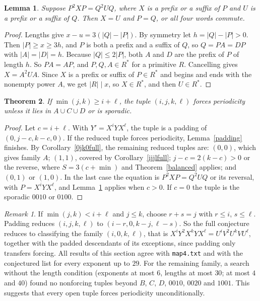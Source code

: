 \documentclass[10pt]{article}
\newtheorem{theorem}{Theorem}
\newtheorem{lemma}[theorem]{Lemma}
\theoremstyle{remark}\newtheorem*{remark}{Remark}
\begin{document}
\begin{lemma}\label{single}
Suppose \(P^2XP=Q^2UQ\), where \(X\) is a prefix or a suffix of \(P\) and \(U\) is a prefix or a suffix of \(Q\). Then \(X=U\) and \(P=Q\), or all four words commute.
\end{lemma}
\begin{proof}
Lengths give \(x-u=3(|Q|-|P|)\). By symmetry let \(h=|Q|-|P|>0\). Then \(|P|\ge x\ge3h\), and \(P\) is both a prefix and a suffix of \(Q\), so \(Q=PA=DP\) with \(|A|=|D|=h\). Because \(|Q|\le2|P|\), both \(A\) and \(D\) are the prefix of \(P\) of length \(h\). So \(PA=AP\), and \(P,Q,A\in R^*\) for a primitive \(R\). Cancelling gives \(X=A^2UA\). Since \(X\) is a prefix or suffix of \(P\in R^*\) and begins and ends with the nonempty power \(A\), we get \(|R|\mid x\), so \(X\in R^*\), and then \(U\in R^*\).
\end{proof}

\begin{theorem}\label{region}
If \(\min(j,k)\ge i+\ell\), the tuple \((i,j,k,\ell)\) forces periodicity unless it lies in \(A\cup C\cup D\) or is sporadic.
\end{theorem}
\begin{proof}
Let \(c=i+\ell\). With \(Y'=X^iYX^\ell\), the tuple is a padding of \((0,j-c,k-c,0)\). If the reduced tuple forces periodicity, Lemma~\ref{padding} finishes. By Corollary~\ref{0jk0full}, the remaining reduced tuples are: \((0,0)\), which gives family \(A\); \((1,1)\), covered by Corollary~\ref{ijjlfull}; \(j-c=2(k-c)>0\) or the reverse, where \(S=3(c+\min)\) and Theorem~\ref{balanced} applies; and \((0,1)\) or \((1,0)\). In the last case the equation is \(P^2XP=Q^2UQ\) or its reversal, with \(P=X^iYX^\ell\), and Lemma~\ref{single} applies when \(c>0\). If \(c=0\) the tuple is the sporadic \(0010\) or \(0100\).
\end{proof}

\begin{remark}
If \(\min(j,k)<i+\ell\) and \(j\le k\), choose \(r+s=j\) with \(r\le i\), \(s\le\ell\). Padding reduces \((i,j,k,\ell)\) to \((i-r,0,k-j,\ell-s)\). So the full conjecture reduces to classifying the family \((i,0,k,\ell)\), that is \(X^iY^2X^kYX^\ell=U^iV^2U^kVU^\ell\), together with the padded descendants of its exceptions, since padding only transfers forcing. All results of this section agree with \texttt{map4.txt} and with the conjectured list for every exponent up to \(29\). For the remaining family, a search without the length condition (exponents at most \(6\), lengths at most \(30\); at most \(4\) and \(40\)) found no nonforcing tuples beyond \(B\), \(C\), \(D\), \(0010\), \(0020\) and \(1001\). This suggests that every open tuple forces periodicity unconditionally.
\end{remark}
\end{document}
